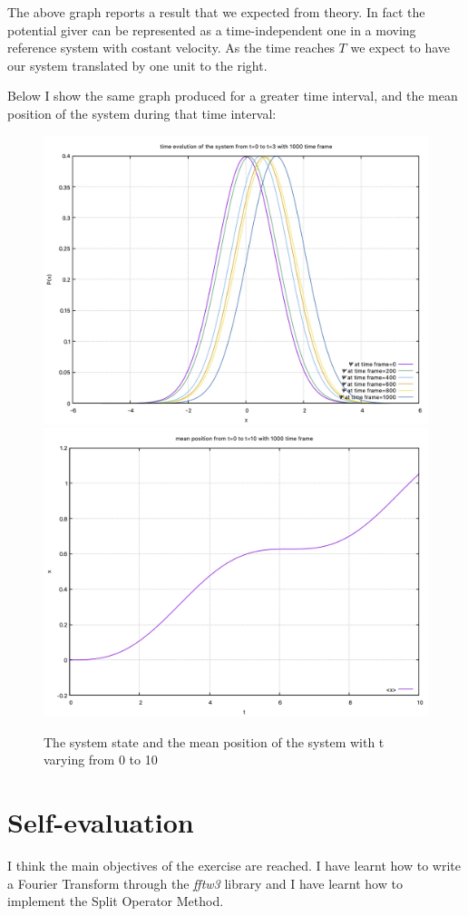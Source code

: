 \documentclass[prb,9pt,notitlepage]{revtex4-1}
\begin{document}
The above graph reports a result that we expected from theory. In fact the potential giver can be represented as a time-independent one in a moving reference system with costant velocity. As the time reaches $T$ we expect to have our system translated by one unit to the right.

Below I show the same graph produced for a greater time interval, and the mean position of the system during that time interval:
\begin{figure}[H]
    \includegraphics[width=.45\textwidth]{time_evol_10}\hfill
    \includegraphics[width=.45\textwidth]{mean_position}\hfill
    \caption{The system state and the mean position of the system with t varying from 0 to 10}\label{fig:foobar}
\end{figure}

\section{Self-evaluation}
I think the main objectives of the exercise are reached. I have learnt how to write a Fourier Transform through the \textit{fftw3} library and I have learnt how to implement the Split Operator Method.
\end{document}
